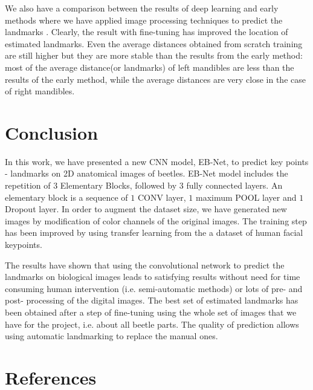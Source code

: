 \documentclass[review]{elsarticle}
\begin{document}
We also have a comparison between the results of deep learning and
early methods where we have applied image processing techniques to
predict the landmarks \cite{le2017maelab}. Clearly, the result with
fine-tuning has improved the location of estimated landmarks. Even the
average distances obtained from scratch training are still higher but
they are more stable than the results from the early method: most of
the average distance(or landmarks) of left mandibles are less than the
results of the early method, while the average distances are very
close in the case of right mandibles.

\section{Conclusion}
\label{sconclusion}
In this work, we have presented a new CNN model, EB-Net, to predict
key points - landmarks on 2D anatomical images of beetles. EB-Net
model includes the repetition of $3$ Elementary Blocks, followed by
$3$ fully connected layers. An elementary block is a sequence of $1$
CONV layer, $1$ maximum POOL layer and $1$ Dropout layer. In order to
augment the dataset size, we have generated new images by modification
of color channels of the original images. The training step has been
improved by using transfer learning from the a dataset of human facial
keypoints.


The results have shown that using the convolutional network to predict
the landmarks on biological images leads to satisfying results without
need for time consuming human intervention (i.e. semi-automatic
methods) or lots of pre- and post- processing of the digital
images. The best set of estimated landmarks has been obtained after a step of fine-tuning using the whole set of images that we have for the
project, i.e. about all beetle parts. The quality of prediction allows using automatic landmarking to replace the manual ones.

\section*{References}



\pagebreak
\appendix
\end{document}
